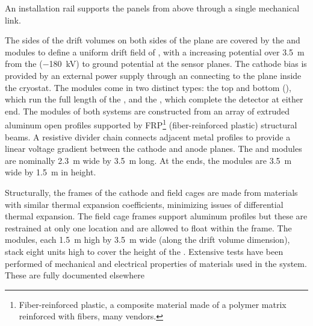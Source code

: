 An  installation rail supports the panels from above through a single mechanical link.

The sides of the drift volumes on both sides of the  plane are covered by the  and   modules to define a uniform drift field of \spmaxfield{}, with a increasing potential over \SI{3.5}{m} from the   (\SI{-180}{kV}) to ground potential at the  sensor planes. The cathode bias is provided by an external  power supply through an  \fdth connecting to the  plane inside the cryostat.
The  modules come in two distinct types: the top and bottom (), which run the full length of the , and the , %
which complete the detector at either end. The modules of both systems are constructed from an array of extruded aluminum open profiles supported by FRP\footnote{Fiber-reinforced plastic, a composite material made of a polymer matrix reinforced with fibers, many vendors.} (fiber-reinforced plastic) structural beams. A resistive divider chain connects adjacent metal profiles to provide a linear voltage gradient between the cathode and anode planes.  The  and  modules are nominally  \SI{2.3}{\meter} wide by  \SI{3.5}{\meter} long. At the ends, the  modules are \SI{3.5}{\meter} wide by \SI{1.5}{\meter} in height.

Structurally, the frames of the cathode and field cages are made from materials with similar thermal expansion coefficients, minimizing issues of differential thermal expansion. The field cage frames support aluminum profiles but these are restrained at only one location and are allowed to float within the frame.
The  modules, each \SI{1.5}{\m} high by \SI{3.5}{\m} wide (along the drift volume dimension), stack eight units high to cover the \tpcheight{} height of the .  
Extensive tests have been performed of mechanical and electrical properties of materials used in the  system.  These are fully documented elsewhere

